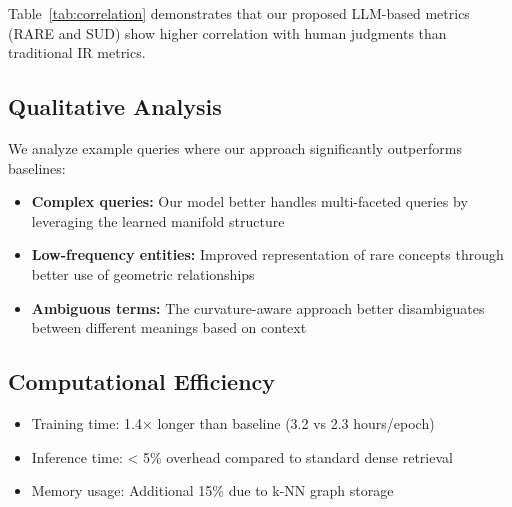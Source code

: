 Table~\ref{tab:correlation} demonstrates that our proposed LLM-based metrics (RARE and SUD) show higher correlation with human judgments than traditional IR metrics.

\subsection{Qualitative Analysis}

We analyze example queries where our approach significantly outperforms baselines:

\begin{itemize}
    \item \textbf{Complex queries:} Our model better handles multi-faceted queries by leveraging the learned manifold structure
    \item \textbf{Low-frequency entities:} Improved representation of rare concepts through better use of geometric relationships
    \item \textbf{Ambiguous terms:} The curvature-aware approach better disambiguates between different meanings based on context
\end{itemize}

\subsection{Computational Efficiency}

\begin{itemize}
    \item Training time: 1.4× longer than baseline (3.2 vs 2.3 hours/epoch)
    \item Inference time: < 5\% overhead compared to standard dense retrieval
    \item Memory usage: Additional 15\% due to k-NN graph storage
\end{itemize}